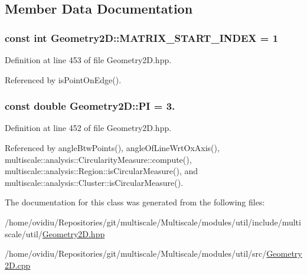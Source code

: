 \subsection{\-Member \-Data \-Documentation}
\hypertarget{classmultiscale_1_1Geometry2D_ade1d55d3ef110b73d42a3e4c4360ba17}{
\subsubsection[{\-M\-A\-T\-R\-I\-X\-\_\-\-S\-T\-A\-R\-T\-\_\-\-I\-N\-D\-E\-X}]{\setlength{\rightskip}{0pt plus 5cm}const int {\bf \-Geometry2\-D\-::\-M\-A\-T\-R\-I\-X\-\_\-\-S\-T\-A\-R\-T\-\_\-\-I\-N\-D\-E\-X} = 1}}\label{classmultiscale_1_1Geometry2D_ade1d55d3ef110b73d42a3e4c4360ba17}


\-Definition at line 453 of file \-Geometry2\-D.\-hpp.



\-Referenced by is\-Point\-On\-Edge().

\hypertarget{classmultiscale_1_1Geometry2D_a7039b8bbe89283e22744c0631d597660}{
\subsubsection[{\-P\-I}]{\setlength{\rightskip}{0pt plus 5cm}const double {\bf \-Geometry2\-D\-::\-P\-I} = 3.}}\label{classmultiscale_1_1Geometry2D_a7039b8bbe89283e22744c0631d597660}


\-Definition at line 452 of file \-Geometry2\-D.\-hpp.



\-Referenced by angle\-Btw\-Points(), angle\-Of\-Line\-Wrt\-Ox\-Axis(), multiscale\-::analysis\-::\-Circularity\-Measure\-::compute(), multiscale\-::analysis\-::\-Region\-::is\-Circular\-Measure(), and multiscale\-::analysis\-::\-Cluster\-::is\-Circular\-Measure().



\-The documentation for this class was generated from the following files\-:\begin{DoxyCompactItemize}
\item 
/home/ovidiu/\-Repositories/git/multiscale/\-Multiscale/modules/util/include/multiscale/util/\hyperlink{Geometry2D_8hpp}{\-Geometry2\-D.\-hpp}\item 
/home/ovidiu/\-Repositories/git/multiscale/\-Multiscale/modules/util/src/\hyperlink{Geometry2D_8cpp}{\-Geometry2\-D.\-cpp}\end{DoxyCompactItemize}
